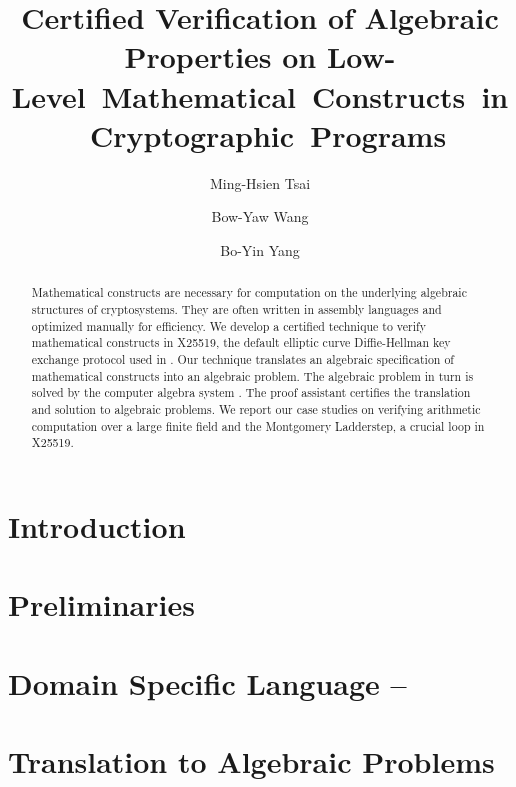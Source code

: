 \documentclass{llncs}
\title{Certified Verification of Algebraic Properties on
Low- \mbox{Level Mathematical Constructs in Cryptographic Programs}}
\author{
Ming-Hsien Tsai
\and
Bow-Yaw Wang
\and
Bo-Yin Yang
%
}
\institute
{
Institute of Information Science\\
Academia Sinica\\
128 Section 2 Academia Road, Taipei 115-29, Taiwan\\
\email{mhtsai208@gmail.com, bywang@iis.sinica.edu.tw, by@crypto.tw}
}
\author{\vspace*{-1.2cm}}
\institute{\vspace*{-1.2cm}\ }
\begin{document}
\maketitle

\begin{abstract}
  Mathematical constructs are necessary for computation on the
  underlying algebraic structures of cryptosystems. They are often
  written in assembly languages and optimized manually for
  efficiency. We develop a certified technique to verify mathematical
  constructs in X25519, the default elliptic curve Diffie-Hellman key
  exchange protocol used in \openssh. Our technique translates an
  algebraic specification of mathematical constructs into an algebraic
  problem. The algebraic 
  problem in turn is solved by the computer algebra system \singular. 
  The proof assistant 
  \coq certifies the translation and solution to algebraic
  problems. We report our case studies on verifying
  arithmetic computation over a large finite field and
  the Montgomery Ladderstep, a crucial loop  in X25519.
\end{abstract}

\vspace{-.5em}
\section{Introduction}
\vspace{-.5em}
\label{section:introduction}


\vspace{-.5em}
\section{Preliminaries}
\vspace{-.5em}
\label{section:preliminaries}


\vspace{-.5em}
\section{Domain Specific Language -- \mydsl}
\vspace{-.5em}
\label{section:domain-specific-language}


\vspace{-.5em}
\section{Translation to Algebraic Problems}
\vspace{-.5em}
\label{section:translation}

\end{document}

